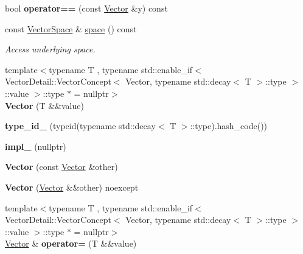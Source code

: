 \begin{DoxyCompactItemize}
\item 
\hypertarget{classSpacy_1_1Vector_a0d634e69572e8da07c3c7056ec911208}{bool {\bfseries operator==} (const \hyperlink{classSpacy_1_1Vector}{\-Vector} \&y) const }\label{classSpacy_1_1Vector_a0d634e69572e8da07c3c7056ec911208}

\item 
\hypertarget{classSpacy_1_1Vector_a8a549d4ed045ddf563afca5bc942397b}{const \hyperlink{classSpacy_1_1VectorSpace}{\-Vector\-Space} \& \hyperlink{classSpacy_1_1Vector_a8a549d4ed045ddf563afca5bc942397b}{space} () const }\label{classSpacy_1_1Vector_a8a549d4ed045ddf563afca5bc942397b}

\begin{DoxyCompactList}\small\item\em \-Access underlying space. \end{DoxyCompactList}\item 
\hypertarget{classSpacy_1_1Vector_a5c5ad7607366066bb752d78611d899cf}{{\footnotesize template$<$typename T , typename std\-::enable\-\_\-if$<$ Vector\-Detail\-::\-Vector\-Concept$<$ Vector, typename std\-::decay$<$ T $>$\-::type $>$\-::value $>$\-::type $\ast$  = nullptr$>$ }\\{\bfseries \-Vector} (\-T \&\&value)}\label{classSpacy_1_1Vector_a5c5ad7607366066bb752d78611d899cf}

\item 
\hypertarget{classSpacy_1_1Vector_a5ff89c1035f984d0cab0183cbb936086}{{\bfseries type\-\_\-id\-\_\-} (typeid(typename std\-::decay$<$ \-T $>$\-::type).hash\-\_\-code())}\label{classSpacy_1_1Vector_a5ff89c1035f984d0cab0183cbb936086}

\item 
\hypertarget{classSpacy_1_1Vector_a50a39d712fc59e65f8e4308fdc7190cf}{{\bfseries impl\-\_\-} (nullptr)}\label{classSpacy_1_1Vector_a50a39d712fc59e65f8e4308fdc7190cf}

\item 
\hypertarget{classSpacy_1_1Vector_ae104dbb1e447a732611cbc2dea2faeb0}{{\bfseries \-Vector} (const \hyperlink{classSpacy_1_1Vector}{\-Vector} \&other)}\label{classSpacy_1_1Vector_ae104dbb1e447a732611cbc2dea2faeb0}

\item 
\hypertarget{classSpacy_1_1Vector_ae328ef6fcf519c6285593cb158c9cc49}{{\bfseries \-Vector} (\hyperlink{classSpacy_1_1Vector}{\-Vector} \&\&other) noexcept}\label{classSpacy_1_1Vector_ae328ef6fcf519c6285593cb158c9cc49}

\item 
\hypertarget{classSpacy_1_1Vector_a1b2ea8c4f0e52b3ca5f6900537daed02}{{\footnotesize template$<$typename T , typename std\-::enable\-\_\-if$<$ Vector\-Detail\-::\-Vector\-Concept$<$ Vector, typename std\-::decay$<$ T $>$\-::type $>$\-::value $>$\-::type $\ast$  = nullptr$>$ }\\\hyperlink{classSpacy_1_1Vector}{\-Vector} \& {\bfseries operator=} (\-T \&\&value)}\label{classSpacy_1_1Vector_a1b2ea8c4f0e52b3ca5f6900537daed02}


\end{DoxyCompactItemize}
